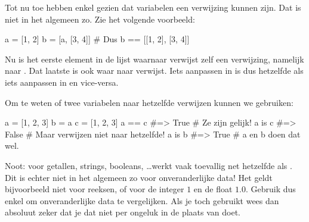   Tot nu toe hebben enkel gezien dat variabelen een verwijzing kunnen zijn. Dat
  is niet in het algemeen zo. Zie het volgende voorbeeld:
  \begin{python}
    a = [1, 2]
    b = [a, [3, 4]] # Dus b == [[1, 2], [3, 4]]
  \end{python}
  Nu is het eerste element in de lijst waarnaar  verwijst zelf een
  verwijzing, namelijk naar \py{[1, 2]}. Dat laatste is ook waar  naar
  verwijst. Iets aanpassen in  is dus hetzelfde als iets aanpassen in
   en vice-versa.

  Om te weten of twee variabelen naar hetzelfde verwijzen kunnen we 
  gebruiken:
  \begin{python}
    a = [1, 2, 3]
    b = a
    c = [1, 2, 3]
    a == c    #=> True  # Ze zijn gelijk!
    a is c    #=> False # Maar verwijzen niet naar hetzelfde!
    a is b    #=> True  # a en b doen dat wel.
  \end{python}
  Noot: voor getallen, strings, booleans, \ldots werkt  vaak toevallig
  net hetzelfde als \py{==}. Dit is echter niet in het algemeen zo voor
  onveranderlijke data! Het geldt bijvoorbeeld niet voor reeksen, of
  voor de integer $1$ en de float $1.0$. Gebruik dus enkel \py{==} om
  onveranderlijke data te vergelijken. Als je toch  gebruikt wees dan
  absoluut zeker dat je dat niet per ongeluk in de plaats van \py{==} doet.
